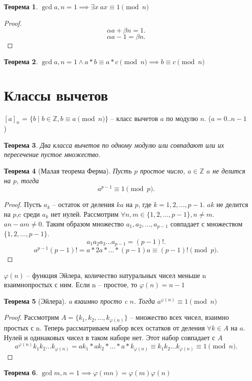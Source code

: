 \documentclass{scrarticle}
\newtheorem{theorem}{Теорема}
\begin{document}
        \begin{theorem}
            $\gcd{a,n} = 1 \implies \exists x ~  ax \equiv 1 \pmod{n}$
        \end{theorem}
        \begin{proof}
            \[
                \alpha a + \beta n = 1
            .\] 
            \[
                \alpha a - 1 = \beta n
            .\] 
        \end{proof}
        \begin{theorem}
            $\gcd{a,n} = 1 \land a*b \equiv a * c \pmod{n} \implies b \equiv c \pmod{n}$
        \end{theorem}
        \section{Классы вычетов}
        $[a]_n$ = $\{b \mid b \in \mathbb{Z} , b \equiv a \pmod{n}\}$ -- класс вычетов $a$ по модулю  $n$. ($a = 0..n-1$)
        \begin{theorem}
            Два класса вычетов по одному модулю или совпадают или их пересечение пустое множество.
        \end{theorem}
        \begin{theorem}[Малая теорема Ферма]
            Пусть $p$ простое число,  $a \in \mathbb{Z}$ $a$ не делится на  $p$, тогда
             \[
                 a^{p - 1} \equiv 1 \pmod{p}
            .\] 
        \end{theorem}
        \begin{proof}
            Пусть $a_k$ -- остаток от деления $ka$ на  $p$, где  $k = 1,2,\dots,p-1$. $ak$ не делится на  $p$,c среди $a_k$ нет нулей. Рассмотрим  $\forall n,m \in \{1,2,\dots,p-1\}, n \neq m$. $an - am \neq 0$. Таким образом множество $a_1,a_2,\dots,a_{p - 1}$ совпадает с множеством $\{ 1,2,\dots,p-1 \}$.
            \[
                a_1 a_2 a_3 \dots a_{p-1} = (p - 1)!
            .\] 
            \[
                a^{p - 1} (p - 1)! = a * 2a * \dots * (p - 1)a \equiv (p - 1)! \pmod{p}
            .\] 
        \end{proof}
        $\varphi(n)$ -- функция Эйлера, количество натуральных чисел меньше n взаимнопростых с ним. Если n -- простое, то  $\varphi(n) = n - 1$
        \begin{theorem}[Эйлера]
            a взаимно просто c $n$. Тогда  $a^{\varphi(n)} \equiv 1 \pmod{n}$
        \end{theorem}
        \begin{proof}
            Рассмотрим  $A = \{k_1,k_2, \dots ,k_{\varphi(n)}\}$ -- множество всех чисел, взаимно простых с n. Теперь рассматриваем набор всех остатков от деления $\forall  k \in A$ на $a$. Нулей и одинаковых чисел в таком наборе нет. Этот набор совпадает с $A$
             \[
                 a^{\varphi(n)}k_1k_2\dots k_{\varphi(n)}  = ak_1 * ak_2 * \dots * a*k_{\varphi(n)} \equiv k_1 k_2 \dots k_{\varphi(n)} \equiv 1 \pmod{n}
            .\]
        \end{proof}
        \begin{theorem}
            $\gcd{m,n} = 1 \implies \varphi(mn) = \varphi(m)\varphi(n)$
        \end{theorem}
\end{document}
